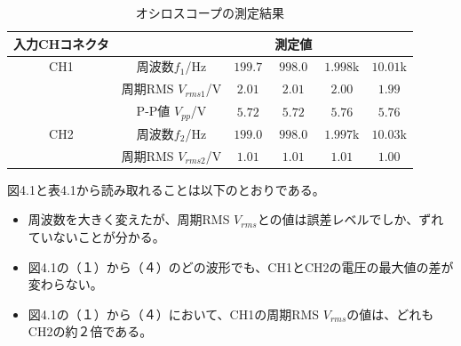 \documentclass[12pt,a4paper]{jsarticle}
\numberwithin{equation}{section}
\numberwithin{figure}{section}
\numberwithin{table}{section}
\begin{document}
\begin{table}[hbtp]
  \caption{オシロスコープの測定結果}
  \label{table:data_type}
  \centering
		\begin{tabular}{|cccccc|}
			\hline
			入力CHコネクタ    &                       &                        & 			測定値					 &                       &                                              \\ 
			\hline
			\hline
					CH1           & 周波数$f_1$/\si{\hertz} & $199.7$  & $998.0$  & $1.998$k & $10.01$k  \\ 
			  	              &    周期RMS $V_{rms1}$/V    & $2.01$   & $2.01$   & $2.00$  & $1.99$   \\
			                  &     P-P値 $V_{pp}$/V     & $5.72$   & $5.72$   & $5.76$  &	$5.76$ 	 \\
			\hline
			    CH2           & 周波数$f_2$/\si{\hertz} & $199.0$  & $998.0$  &	$1.997$k	& $10.03$k  \\
			                  &     周期RMS $V_{rms2}$/V    & $1.01$   & $1.01$		& $1.01$	&	$1.00$	 \\
			\hline  
		\end{tabular}
\end{table}
図4.1と表4.1から読み取れることは以下のとおりである。
\begin{itemize}
	\item 周波数を大きく変えたが、周期RMS $V_{rms}$との値は誤差レベルでしか、ずれていないことが分かる。
	\item 図4.1の（１）から（４）のどの波形でも、CH1とCH2の電圧の最大値の差が変わらない。
	\item  図4.1の（１）から（４）において、CH1の周期RMS $V_{rms}$の値は、どれもCH2の約２倍である。
\end{itemize}

\newpage
\end{document}
